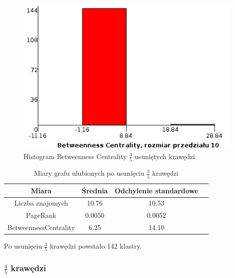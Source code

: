 \documentclass[10pt,a4paper]{article}
\begin{document}
\begin{figure}[H]
\centering
\caption{Histogram Betweenness Centrality $\frac{3}{5}$ usuniętych krawędzi}
\includegraphics[scale=0.6]{wyniki/final200Loved/3200lovedBCHist.png}
\end{figure}


\begin{table}[H]
  \caption{Miary grafu ulubionych po usunięciu $\frac{3}{5}$ krawędzi}
  \centering
    \begin{tabular}{cccc}
    \addlinespace
    \toprule
    Miara & Średnia  & Odchylenie standardowe \\
    \midrule
    Liczba znajomych & 10.76 & 10.53 \\
    PageRank & 0.0050 & 0.0052 \\
    BetweennessCentrality & 6.25 & 14.10\\ 
    \bottomrule
    \end{tabular}
  \label{tab:addlabel}
\end{table}

Po usunięciu $\frac{3}{5}$ krawędzi powstało 142 klastry. 

\subsubsection {$\frac{4}{5}$ krawędzi}
\end{document}
